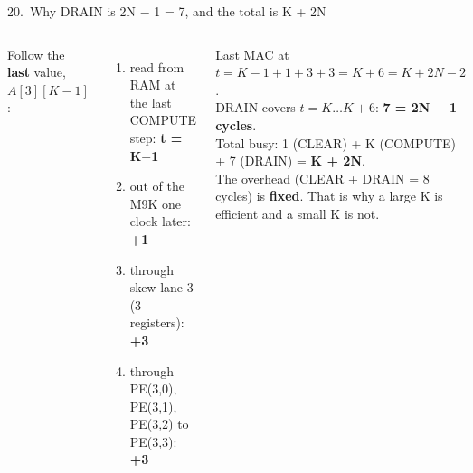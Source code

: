 \documentclass[aspectratio=169,11pt]{beamer}
\begin{document}
\begin{frame}{20.\ Why DRAIN is 2N $-$ 1 = 7, and the total is K + 2N}
  \begin{columns}[T]
    \small
    Follow the \textbf{last} value, $A[3][K{-}1]$:
    \begin{enumerate}
      \item read from RAM at the last COMPUTE step: \textbf{t = K$-$1}
      \item out of the M9K one clock later: \textbf{+1}
      \item through skew lane 3 (3 registers): \textbf{+3}
      \item through PE(3,0), PE(3,1), PE(3,2) to PE(3,3): \textbf{+3}
    \end{enumerate}
    Last MAC at $t = K - 1 + 1 + 3 + 3 = K + 6 = K + 2N - 2$.\\[1mm]
    DRAIN covers $t = K \ldots K+6$: \textbf{7 = 2N $-$ 1 cycles}.\\[1mm]
    Total busy: 1 (CLEAR) + K (COMPUTE) + 7 (DRAIN) = \textbf{K + 2N}.
    \small
    \\[2mm]
    The overhead (CLEAR + DRAIN = 8 cycles) is \textbf{fixed}. That is why a large K is efficient and a small K is not.
  \end{columns}
\end{frame}

\end{document}
